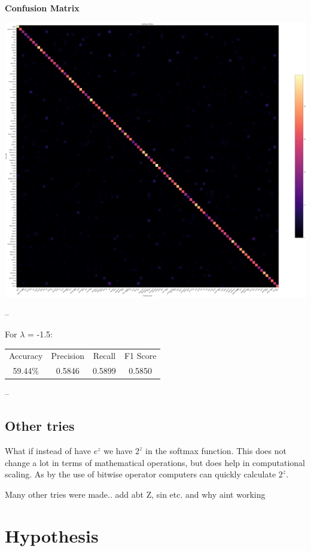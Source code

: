 \documentclass{article}
\begin{document}
\textbf{Confusion Matrix}

\includegraphics[width=0.9\linewidth]{images/LogGumbelSoftmax/cm-loggumbel.png}

--

\newline
For \(\lambda\) = -1.5:

\begin{center}
\begin{tabular}{ |c|c|c|c| } 
 \hline
 Accuracy & Precision & Recall & F1 Score \\ 
 59.44\% & 0.5846 & 0.5899 & 0.5850 \\
 \hline
\end{tabular}
\end{center}

--



\subsection{Other tries}

What if instead of have \(e^z\) we have \(2^z\) in the softmax function. This does not change a lot in terms of mathematical operations, but does help in computational scaling. As by the use of bitwise operator computers can quickly calculate \(2^z\).

Many other tries were made.. add abt Z, sin etc. and why aint working




\section{Hypothesis}
\end{document}
